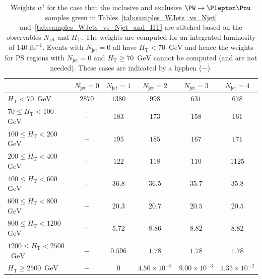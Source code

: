 \documentclass[twocolumn,epjc3]{svjour3}
\newcommand{\HT}{\ensuremath{H_{\mathrm{T}}}\xspace}
\newcommand{\GeV}{\ensuremath{\textrm{GeV}}\xspace}
\newcommand{\jet}{\ensuremath{\textrm{jet}}\xspace}
\newcommand{\fbinv}{\ensuremath{\textrm{~fb}^{-1}}\xspace}
\begin{document}
\begin{table}
\caption{
  Weights $w^{i}$ for the case that the inclusive and exclusive $\PW \to \Plepton\Pnu$ samples 
  given in 
  Tables~\ref{tab:samples_WJets_vs_Njet} and~\ref{tab:samples_WJets_vs_Njet_and_HT}
  are stitched based on the observables $N_{\jet}$ and $\HT$.
  The weights are computed for an integrated luminosity of $140\fbinv$.
  Events with $N_{\jet} = 0$ all have $\HT < 70$~\GeV and hence the weights for PS regions with $N_{\jet} = 0$ and $\HT \geqslant 70$~\GeV cannot be computed (and are not needed).
  These cases are indicated by a hyphen ($-$).
}
\label{tab:weights_WJets_vs_Njet_and_HT}
\begin{center}
\begin{tabular}{l|c|c|c|c|c}
\hline
                                 & $N_{\jet} = 0$ & $N_{\jet} = 1$      & $N_{\jet} = 2$      & $N_{\jet} = 3$      & $N_{\jet} = 4$       \\ 
\hline
               $\HT < 70$~\GeV   & $2870$         & $1380$              & $998$               & $631$               &  $678$               \\
  $70 \leqslant \HT < 100$~\GeV  & $-$            &  $183$              & $173$               & $158$               &  $161$               \\
 $100 \leqslant \HT < 200$~\GeV  & $-$            &  $195$              & $185$               & $167$               &  $171$               \\
 $200 \leqslant \HT < 400$~\GeV  & $-$            &  $122$              & $118$               & $110$               &  $1125$              \\
 $400 \leqslant \HT < 600$~\GeV  & $-$            & $36.8$              & $36.5$              & $35.7$              &  $35.8$              \\
 $600 \leqslant \HT < 800$~\GeV  & $-$            & $20.3$              & $20.7$              & $20.5$              &  $20.5$              \\
 $800 \leqslant \HT < 1200$~\GeV & $-$            & $5.72$              & $8.86$              & $8.82$              &  $8.82$              \\
$1200 \leqslant \HT < 2500$~\GeV & $-$            & $0.596$             & $1.78$              & $1.78$              &  $1.78$              \\
       $\HT \geqslant 2500$~\GeV & $-$            & $0$                 & $4.50\times10^{-3}$ & $9.00\times10^{-3}$ &  $1.35\times10^{-2}$ \\ 
\hline
\end{tabular}
\end{center}
\end{table}
\end{document}
